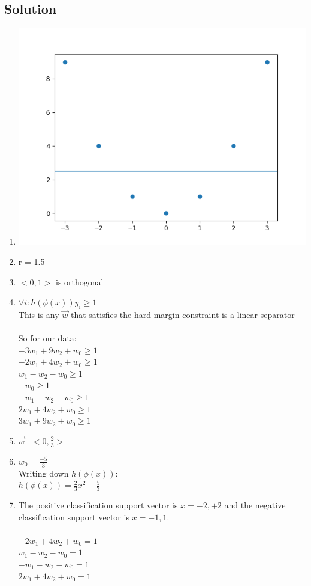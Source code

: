 \documentclass[submit]{harvardml}
\begin{document}
\subsection*{Solution}

\begin{enumerate}
    \item
        \includegraphics[scale=.5]{prob1.png}
    \item
        r = 1.5
    \item
        $<0,1>$ is orthogonal
    \item
        $\forall i : h(\phi(x))y_i \ge 1$ \\
        This is any $\vec{w}$ that satisfies the hard margin constraint is a
        linear separator \\ \\
        So for our data: \\
        $-3w_1 + 9w_2 + w_0 \ge 1$ \\
        $-2w_1 + 4w_2 + w_0 \ge 1$ \\
        $w_1 - w_2 - w_0 \ge 1$ \\
        $-w_0 \ge 1$ \\
        $-w_1 - w_2 - w_0 \ge 1$ \\
        $2w_1 + 4w_2 + w_0 \ge 1$ \\
        $3w_1 + 9w_2 + w_0 \ge 1$ \\
    \item
        $\vec{w} - <0,\frac{2}{3}>$
    \item
        $w_0 = \frac{-5}{3}$ \\
        Writing down $h(\phi(x))$: \\
        $h(\phi(x)) = \frac{2}{3}x^2 - \frac{5}{3}$
    \item
        The positive classification support vector is $x = -2, +2$ and the
        negative classification support vector is $x = -1, 1$. \\ \\
        $-2w_1 + 4w_2 + w_0 = 1$ \\
        $w_1 - w_2 - w_0 = 1$ \\
        $-w_1 - w_2 - w_0 = 1$ \\
        $2w_1 + 4w_2 + w_0 = 1$ \\


\end{enumerate}
\end{document}
